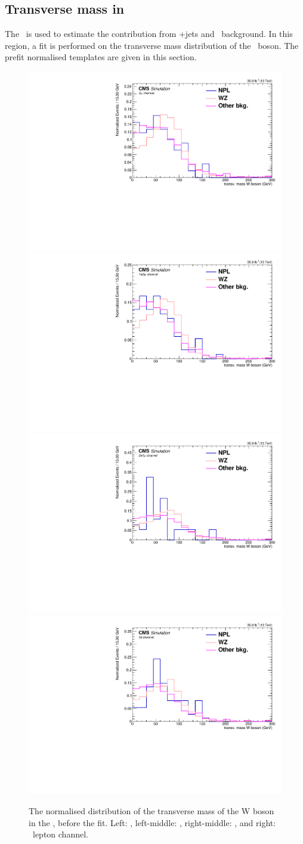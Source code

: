 \subsection{Transverse mass in \WZCR}
The \WZCR\ is used to estimate the contribution from \WZ+jets and \NPL\ background. In this region, a fit is performed on the transverse mass distribution of the \PW\ boson. The prefit normalised templates are given in this section. 
\begin{figure}[htbp]
	\centering
	\includegraphics[width=0.49\linewidth]{6_Search/Figures/MTWnormalised/MTW_uuu_Normalized}
	\includegraphics[width=0.49\linewidth]{6_Search/Figures/MTWnormalised/MTW_uue_Normalized}
	\includegraphics[width=0.49\linewidth]{6_Search/Figures/MTWnormalised/MTW_eeu_Normalized}
	\includegraphics[width=0.49\linewidth]{6_Search/Figures/MTWnormalised/MTW_eee_Normalized}
	\caption{The normalised distribution of the transverse mass of the W boson in the \WZCR, before the fit. Left: \mumumu, left-middle: \emumu, right-middle: \eemu, and right: \eee\ lepton channel.  }
	\label{fig:mtwnorm}
\end{figure}
